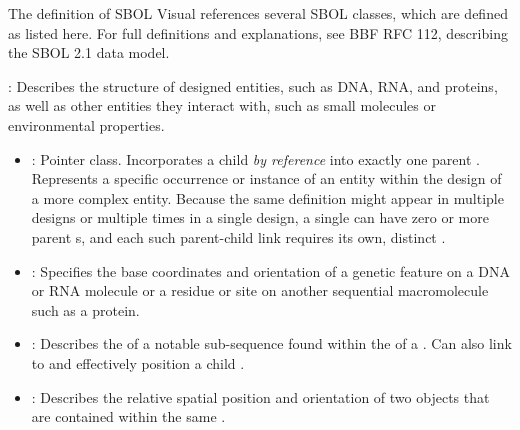 The definition of SBOL Visual references several SBOL classes, which are defined as listed here.  For full definitions and explanations, see BBF RFC 112, describing the SBOL 2.1 data model.

\begin{description}


\item \emph{}: Describes the structure of designed entities, such as DNA, RNA, and proteins, as well as other entities they interact with, such as small molecules or environmental properties.

\begin{itemize}
\item \emph{}:
Pointer class. Incorporates a child  \textit{by reference} into exactly one parent . Represents a specific occurrence or instance of an entity within the design of a more complex entity. Because the same definition might appear in  multiple designs or multiple times in a single design, a single  can have zero or more parent s, and each such parent-child link requires its own, distinct .

\item \emph{}:
Specifies the base coordinates and orientation of a genetic feature on a DNA or RNA molecule or a residue or site on another sequential macromolecule such as a protein.

\item \emph{}:
Describes the  of a notable sub-sequence found within the  of a . Can also link to and effectively position a child .

\item \emph{}:
Describes the relative spatial position and orientation of two  objects that are contained within the same .
\end{itemize}



\end{description}

